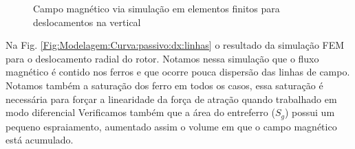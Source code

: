 \begin{figure}[!ht]
	\centering
		\label{Fig:Modelagem:Curva:passivo:dy:linhas:0}
		\label{Fig:Modelagem:Curva:passivo:dy:linhas:1,2}
	\caption{Campo magnético via simulação em elementos finitos para deslocamentos na vertical}
	\label{Fig:Modelagem:Curva:passivo:dy:linhas}
\end{figure}

Na Fig. \ref{Fig:Modelagem:Curva:passivo:dx:linhas} o resultado da simulação FEM para o deslocamento radial do rotor. Notamos nessa simulação que o fluxo magnético é contido nos ferros e que ocorre pouca dispersão das linhas de campo. Notamos também a saturação dos ferro em todos os casos, essa saturação é necessária para forçar a linearidade da força de atração quando trabalhado em modo diferencial Verificamos também que a área do entreferro ($S_g$) possui um pequeno espraiamento, aumentado assim o volume em que o campo magnético está acumulado. 

